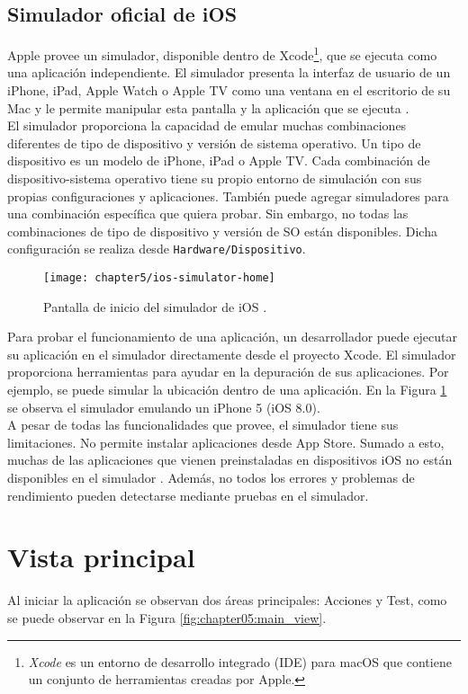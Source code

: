 \subsection{Simulador oficial de iOS}
Apple provee un simulador, disponible dentro de Xcode\footnote{\emph{Xcode} es un entorno de desarrollo integrado (IDE) para macOS que contiene un conjunto de herramientas creadas por Apple.}, que se ejecuta como una aplicación independiente. El simulador presenta la interfaz de usuario de un iPhone, iPad, Apple Watch o Apple TV como una ventana en el escritorio de su Mac y le permite manipular esta pantalla y la aplicación que se ejecuta \cite{iosds}.\\

El simulador proporciona la capacidad de emular muchas combinaciones diferentes de tipo de dispositivo y versión de sistema operativo. Un tipo de dispositivo es un modelo de iPhone, iPad o Apple TV. Cada combinación de dispositivo-sistema operativo tiene su propio entorno de simulación con sus propias configuraciones y aplicaciones. También puede agregar simuladores para una combinación específica que quiera probar. Sin embargo, no todas las combinaciones de tipo de dispositivo y versión de SO están disponibles. Dicha configuración se realiza desde \texttt{Hardware/Dispositivo}.\\
\begin{figure}[tbp]
    \centering
	\texttt{[image: chapter5/ios-simulator-home]}
	\caption{Pantalla de inicio del simulador de iOS \cite{iosds}.}
    \label{fig:ch05:ios-simulator-home}
\end{figure}

Para probar el funcionamiento de una aplicación, un desarrollador puede ejecutar su aplicación en el simulador directamente desde el proyecto Xcode. El simulador proporciona herramientas para ayudar en la depuración de sus aplicaciones. Por ejemplo, se puede simular la ubicación dentro de una aplicación. En la Figura \ref{fig:ch05:ios-simulator-home} se observa el simulador emulando un iPhone 5 (iOS 8.0).\\

A pesar de todas las funcionalidades que provee, el simulador tiene sus limitaciones. No permite instalar aplicaciones desde App Store. Sumado a esto, muchas de las aplicaciones que vienen preinstaladas en dispositivos iOS no están disponibles en el simulador \cite{iosds}. Además, no todos los errores y problemas de rendimiento pueden detectarse mediante pruebas en el simulador.
\section{Vista principal} \label{sec:main-view}
Al iniciar la aplicación se observan dos áreas principales: Acciones y Test, como se puede observar en la Figura \ref{fig:chapter05:main_view}.\\

